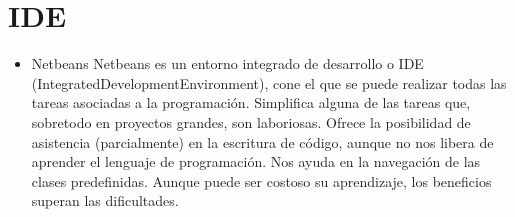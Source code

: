 	\section{IDE}
	\begin{itemize}
		\item  Netbeans 
		\label{Herramientas}
		\newline
		Netbeans es un entorno integrado de desarrollo o IDE (IntegratedDevelopmentEnvironment), cone el que se puede realizar todas las tareas asociadas a la programación.
		\newline
		Simplifica alguna de las tareas que, sobretodo en proyectos grandes, son laboriosas. Ofrece la posibilidad de asistencia (parcialmente) en la escritura de código, aunque no nos libera de aprender el lenguaje de programación.
		Nos ayuda en la navegación de las clases predefinidas.
		Aunque puede ser costoso su aprendizaje, los beneficios superan las dificultades.
		

\end{itemize}
